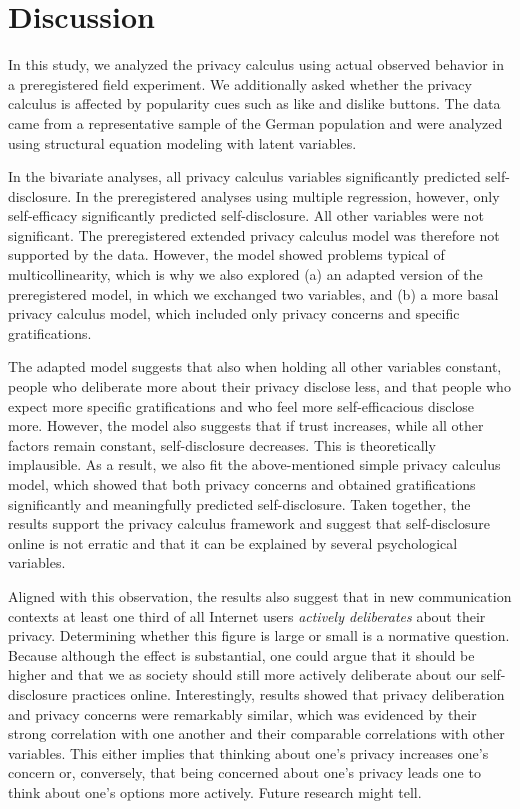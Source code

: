 \documentclass[
  english,
  man,floatsintext]{apa6}
\begin{document}
\hypertarget{discussion}{%
\section{Discussion}\label{discussion}}

In this study, we analyzed the privacy calculus using actual observed behavior in a preregistered field experiment.
We additionally asked whether the privacy calculus is affected by popularity cues such as like and dislike buttons.
The data came from a representative sample of the German population and were analyzed using structural equation modeling with latent variables.

In the bivariate analyses, all privacy calculus variables significantly predicted self-disclosure.
In the preregistered analyses using multiple regression, however, only self-efficacy significantly predicted self-disclosure.
All other variables were not significant.
The preregistered extended privacy calculus model was therefore not supported by the data.
However, the model showed problems typical of multicollinearity, which is why we also explored (a) an adapted version of the preregistered model, in which we exchanged two variables, and (b) a more basal privacy calculus model, which included only privacy concerns and specific gratifications.

The adapted model suggests that also when holding all other variables constant, people who deliberate more about their privacy disclose less, and that people who expect more specific gratifications and who feel more self-efficacious disclose more.
However, the model also suggests that if trust increases, while all other factors remain constant, self-disclosure decreases.
This is theoretically implausible.
As a result, we also fit the above-mentioned simple privacy calculus model, which showed that both privacy concerns and obtained gratifications significantly and meaningfully predicted self-disclosure.
Taken together, the results support the privacy calculus framework and suggest that self-disclosure online is not erratic and that it can be explained by several psychological variables.

Aligned with this observation, the results also suggest that in new communication contexts at least one third of all Internet users \emph{actively deliberates} about their privacy.
Determining whether this figure is large or small is a normative question.
Because although the effect is substantial, one could argue that it should be higher and that we as society should still more actively deliberate about our self-disclosure practices online.
Interestingly, results showed that privacy deliberation and privacy concerns were remarkably similar, which was evidenced by their strong correlation with one another and their comparable correlations with other variables.
This either implies that thinking about one's privacy increases one's concern or, conversely, that being concerned about one's privacy leads one to think about one's options more actively.
Future research might tell.
\end{document}
